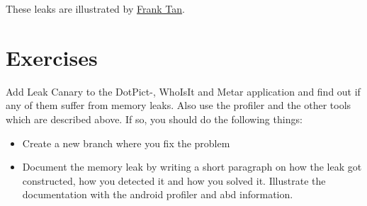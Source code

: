 These leaks are illustrated by \href{https://github.com/frank-tan/SinsOfMemoryLeaks}{Frank Tan}.

\newpage
\section{Exercises}
\begin{exercise}
	Add Leak Canary to the DotPict-, WhoIsIt and Metar application and find out if any of them suffer from memory leaks. Also use the profiler and the other tools which are described above. If so, you should do the following things:
	\begin{itemize}
		\item Create a new branch where you fix the problem
		\item Document the memory leak by writing a short paragraph on how the leak got constructed, how you detected it and how you solved it. Illustrate the documentation with the android profiler and abd information.
	\end{itemize}
	
\end{exercise}
